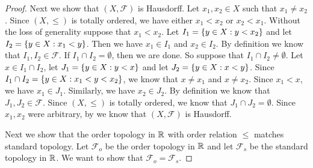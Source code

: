 \begin{proof}
  Next we show that \((X, \mathcal{F})\) is Hausdorff.
  Let \(x_1, x_2 \in X\) such that \(x_1 \neq x_2\).
  Since \((X, \leq)\) is totally ordered, we have either \(x_1 < x_2\) or \(x_2 < x_1\).
  Without the loss of generality suppose that \(x_1 < x_2\).
  Let \(I_1 = \left\lbrace y \in X : y < x_2\right\rbrace\) and let \(I_2 = \left\lbrace y \in X : x_1 < y\right\rbrace\).
  Then we have \(x_1 \in I_1\) and \(x_2 \in I_2\).
  By definition we know that \(I_1, I_2 \in \mathcal{F}\).
  If \(I_1 \cap I_2 = \emptyset\), then we are done.
  So suppose that \(I_1 \cap I_2 \neq \emptyset\).
  Let \(x \in I_1 \cap I_2\), let \(J_1 = \left\lbrace y \in X : y < x\right\rbrace\) and let \(J_2 = \left\lbrace y \in X : x < y\right\rbrace\).
  Since \(I_1 \cap I_2 = \left\lbrace y \in X : x_1 < y < x_2\right\rbrace\), we know that \(x \neq x_1\) and \(x \neq x_2\).
  Since \(x_1 < x\), we have \(x_1 \in J_1\).
  Similarly, we have \(x_2 \in J_2\).
  By definition we know that \(J_1, J_2 \in \mathcal{F}\).
  Since \((X, \leq)\) is totally ordered, we know that \(J_1 \cap J_2 = \emptyset\).
  Since \(x_1, x_2\) were arbitrary, by  we know that \((X, \mathcal{F})\) is Hausdorff.

  Next we show that the order topology in \(\mathbb{R}\) with order relation \(\leq\) matches standard topology.
  Let \(\mathcal{F}_o\) be the order topology in \(\mathbb{R}\) and let \(\mathcal{F}_s\) be the standard topology in \(\mathbb{R}\).
  We want to show that \(\mathcal{F}_o = \mathcal{F}_s\).


\end{proof}
